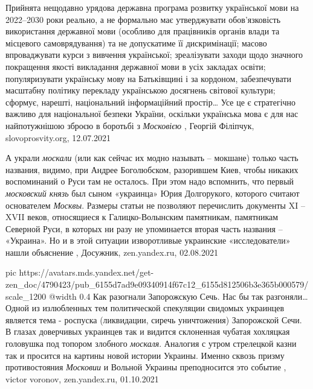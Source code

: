 Прийнята нещодавно урядова державна програма розвитку української мови на
2022–2030 роки реально, а не формально має утверджувати обов’язковість
використання державної мови (особливо для працівників органів влади та
місцевого самоврядування) та не допускатиме її дискримінації; масово
впроваджувати курси з вивчення української; зреалізувати заходи щодо значного
покращення якості викладання державної мови в усіх закладах освіти;
популяризувати українську мову на Батьківщині і за кордоном, забезпечувати
масштабну політику перекладу українською досягнень світової культури; сформує,
нарешті, національний інформаційний простір… Усе це є стратегічно важливо для
національної безпеки України, оскільки українська мова є для нас найпотужнішою
зброєю в боротьбі з \emph{Московією}
, Георгій Філіпчук, slovoprosvity.org, 12.07.2021

А украли \emph{москали} (или как сейчас их модно называть – мокшане) только часть
названия, видимо, при Андрее Боголюбском, разорившем Киев, чтобы никаких
воспоминаний о Руси там не осталось. При этом надо вспомнить, что первый
\emph{московский князь} был сыном «украинца» Юрия Долгорукого, которого считают
основателем \emph{Москвы}.  Размеры статьи не позволяют перечислить документы XI –
XVII веков, относящиеся к Галицко-Волынским памятникам, памятникам Северной
Руси, в которых ни разу не упоминается вторая часть названия – «Украина». Но и
в этой ситуации изворотливые украинские «исследователи» нашли объяснение
, Досужник, zen.yandex.ru, 02.08.2021

\ifcmt
  pic https://avatars.mds.yandex.net/get-zen_doc/4790423/pub_6155d7ad9e09340914f67c12_6155d812506b3e365b000579/scale_1200
  @width 0.4
\fi
Как разогнали Запорожскую Сечь. Нас бы так разгоняли… Одной из излюбленных тем
политической спекуляции свидомых украинцев является тема - роспуска
(ликвидации, сиречь уничтожения) Запорожской Сечи. В глазах доверчивых
украинцев так и видится склоненная чубатая хохляцкая головушка под топором
злобного \emph{москаля}. Аналогия с утром стрелецкой казни так и просится на картины
новой истории Украины. Именно сквозь призму противостояния \emph{Московии} и Вольной
Украины преподносится это событие
, 
victor voronov, zen.yandex.ru, 01.10.2021

